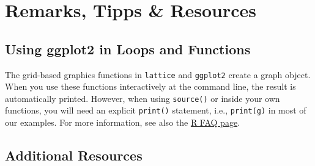 \documentclass[
  letterpaper,
  DIV=11,
  numbers=noendperiod]{scrreprt}
\begin{document}

\chapter*{Remarks, Tipps \& Resources}\label{remarks-tipps-resources}


\section*{Using ggplot2 in Loops and
Functions}\label{using-ggplot2-in-loops-and-functions}


The grid-based graphics functions in \texttt{lattice} and
\texttt{ggplot2} create a graph object. When you use these functions
interactively at the command line, the result is automatically printed.
However, when using \texttt{source()} or inside your own functions, you
will need an explicit \texttt{print()} statement, i.e.,
\texttt{print(g)} in most of our examples. For more information, see
also the
\href{https://cran.r-project.org/doc/FAQ/R-FAQ.html\#Why-do-lattice_002ftrellis-graphics-not-work_003f}{R
FAQ page}.

\section*{Additional Resources}\label{additional-resources}

\end{document}
